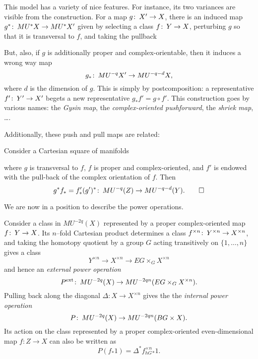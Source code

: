 \begin{remark}
This model has a variety of nice features.  For instance, its two variances are visible from the construction.  For a map $g\colon\thinspace X' \to X$, there is an induced map $g^*\colon\thinspace MU^* X \to MU^* X'$ given by selecting a class $f\colon\thinspace Y \to X$, perturbing $g$ so that it is transversal to $f$, and taking the pullback
\begin{center}
\end{center}
But, also, if $g$ is additionally proper and complex-orientable, then it induces a wrong way map \[g_*\colon\thinspace MU^{-q} X' \to MU^{-q-d} X,\] where $d$ is the dimension of $g$.  This is simply by postcomposition: a representative $f'\colon\thinspace Y' \to X'$ begets a new representative $g_* f' = g \circ f'$.  This construction goes by various names: the \textit{Gysin map}, the \textit{complex-oriented pushforward}, the \textit{shriek map}, \ldots.
\end{remark}

Additionally, these push and pull maps are related:
\begin{lemma}\label{PushPullFormulaForMU}
Consider a Cartesian square of manifolds
\begin{center}
\end{center}
where $g$ is transversal to $f$, $f$ is proper and complex-oriented, and $f'$ is endowed with the pull-back of the complex orientation of $f$. Then \[g^* f_* = f'_* (g')^*\colon\thinspace MU^{-q}(Z) \to MU^{-q-d}(Y). \qed\]
\end{lemma}


We are now in a position to describe the power operations.
\begin{definition}\label{DefnPowerOperationForMU}
Consider a class in $MU^{-2q}(X)$ represented by a proper complex-oriented map $f \colon\thinspace Y \to X$.  Its $n$--fold Cartesian product determines a class $f^{\times n} \colon\thinspace Y^{\times n} \to X^{\times n}$, and taking the homotopy quotient by a group $G$ acting transitively on $\{1, \ldots, n\}$ gives a class \[Y^{\times n} \to X^{\times n} \to EG \times_G X^{\times n}\] and hence an \textit{external power operation} \[P^{\mathrm{ext}} \colon\thinspace MU^{-2q}(X) \to MU^{-2qn}(EG \times_G X^{\times n}).\]  Pulling back along the diagonal $\Delta: X \to X^{\times n}$ gives the the \textit{internal power operation} \[P \colon\thinspace MU^{-2q}(X) \to MU^{-2qn}(BG \times X).\]  Its action on the class represented by a proper complex-oriented even-dimensional map $f: Z \to X$ can also be written as \[P(f_* 1) = \Delta^* f^{\times n}_{hG}{}_* 1.\] 
\end{definition}

